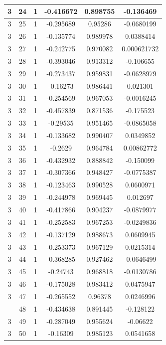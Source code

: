 \documentclass[12pt,a4paper]{article}
\numberwithin{equation}{section}
\numberwithin{figure}{section}
\numberwithin{table}{section}
\begin{document}
\begin{longtable}{|c|c|c|c|c|c|}
3 & 24 & 1 & -0.416672 & 0.898755 & -0.136469 \\ \hline
3 & 25 & 1 & -0.295689 & 0.95286 & -0.0680199 \\ \hline
3 & 26 & 1 & -0.135774 & 0.989978 & 0.0388414 \\ \hline
3 & 27 & 1 & -0.242775 & 0.970082 & 0.000621732 \\ \hline
3 & 28 & 1 & -0.393046 & 0.913312 & -0.106655 \\ \hline
3 & 29 & 1 & -0.273437 & 0.959831 & -0.0628979 \\ \hline
3 & 30 & 1 & -0.16273 & 0.986441 & 0.021301 \\ \hline
3 & 31 & 1 & -0.254569 & 0.967053 & -0.0016245 \\ \hline
3 & 32 & 1 & -0.457839 & 0.871536 & -0.175523 \\ \hline
3 & 33 & 1 & -0.29535 & 0.951465 & -0.0865058 \\ \hline
3 & 34 & 1 & -0.133682 & 0.990407 & 0.0349852 \\ \hline
3 & 35 & 1 & -0.2629 & 0.964784 & 0.00862772 \\ \hline
3 & 36 & 1 & -0.432932 & 0.888842 & -0.150099 \\ \hline
3 & 37 & 1 & -0.307366 & 0.948427 & -0.0775387 \\ \hline
3 & 38 & 1 & -0.123463 & 0.990528 & 0.0600971 \\ \hline
3 & 39 & 1 & -0.244978 & 0.969445 & 0.012697 \\ \hline
3 & 40 & 1 & -0.417866 & 0.904237 & -0.0879977 \\ \hline
3 & 41 & 1 & -0.252583 & 0.967253 & -0.0249836 \\ \hline
3 & 42 & 1 & -0.137129 & 0.988673 & 0.0609945 \\ \hline
3 & 43 & 1 & -0.253373 & 0.967129 & 0.0215314 \\ \hline
3 & 44 & 1 & -0.368285 & 0.927462 & -0.0646499 \\ \hline
3 & 45 & 1 & -0.24743 & 0.968818 & -0.0130786 \\ \hline
3 & 46 & 1 & -0.175028 & 0.983412 & 0.0475947 \\ \hline
3 & 47 & 1 & -0.265552 & 0.96378 & 0.0246996 \\ \hline
\pagebreak
3 & 48 & 1 & -0.434638 & 0.891445 & -0.128122 \\ \hline
3 & 49 & 1 & -0.287049 & 0.955624 & -0.06622 \\ \hline
3 & 50 & 1 & -0.16309 & 0.985123 & 0.0541658 \\ \hline

\end{longtable}
\end{document}
